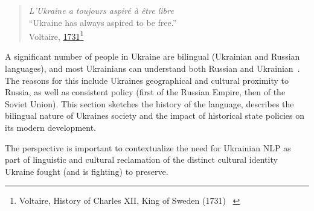 \begin{quote}
\emph{L'Ukraine a toujours aspiré à être libre}\\
``Ukraine has always aspired to be free.'' \\ Voltaire, \href{https://books.google.com.ua/books?id=Lh8TAAAAQAAJ&pg=PA275&lpg=PA275&dq=\%22L\%E2\%80\%99Ukraine+a+toujours+aspir\%C3\%A9+\%C3\%A0+\%C3\%AAtre+libre\%22&source=bl&ots=gvCwzOT0nI&sig=ACfU3U2PCd60vC7uxL9hCteT47A0Iiq8og&hl=en&sa=X&ved=2ahUKEwjjuNuwqOb0AhUhpIsKHeHsCQcQ6AF6BAgUEAM\#v=onepage&q=\%22L\%E2\%80\%99Ukraine\%20a\%20toujours\%20aspir\%C3\%A9\%20\%C3\%A0\%20\%C3\%AAtre\%20libre\%22&f=false}{1731}\footnote{Voltaire, History of Charles XII, King of Sweden (1731)
~\cite{1817oeuvres}}
\end{quote}

A significant number of people in Ukraine are bilingual (Ukrainian and
Russian languages), and most Ukrainians can understand both Russian and
Ukrainian~\cite{kulyk2018shedding}. 
The reasons for this include Ukraine\textquotesingle s geographical and
cultural proximity to Russia, as well as consistent policy (first of
the Russian Empire, then of the Soviet Union).
This section sketches the history of the language, describes the
bilingual nature of Ukraine\textquotesingle s society and the impact of
historical state policies on its modern development.

The perspective is important to contextualize 
the need for Ukrainian NLP as part of linguistic and cultural reclamation
of the distinct cultural identity Ukraine fought (and is fighting) 
to preserve. 

